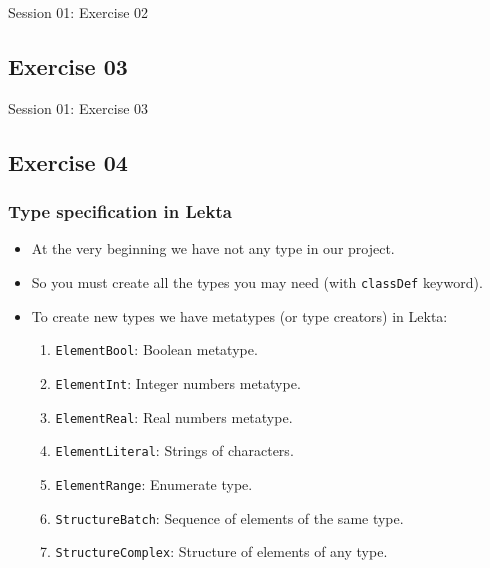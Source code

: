 \documentclass[11pt]{beamer}
\begin{document}
\begin{frame}[fragile]
\Huge
\begin{center}
Session 01: Exercise 02
\end{center}
\end{frame}

\subsection{Exercise 03}

\begin{frame}[fragile]
\Huge
\begin{center}
Session 01: Exercise 03
\end{center}
\end{frame}

\subsection{Exercise 04}

\begin{frame}[fragile]
\frametitle{Type specification in Lekta}
\begin{itemize}
	\item At the very beginning we have not any type in our project.
	\pause
	\item So you must create all the types you may need (with \texttt{classDef} keyword).
	\pause
	\item To create new types we have metatypes (or type creators) in Lekta:
	\begin{enumerate}
		\item \texttt{ElementBool}: Boolean metatype.
		\item \texttt{ElementInt}: Integer numbers metatype.
		\item \texttt{ElementReal}: Real numbers metatype.
		\item \texttt{ElementLiteral}: Strings of characters.
		\item \texttt{ElementRange}: Enumerate type.
		\item \texttt{StructureBatch}: Sequence of elements of the same type.
		\item \texttt{StructureComplex}: Structure of elements of any type.
	\end{enumerate}
\end{itemize}
\end{frame}
\end{document}
